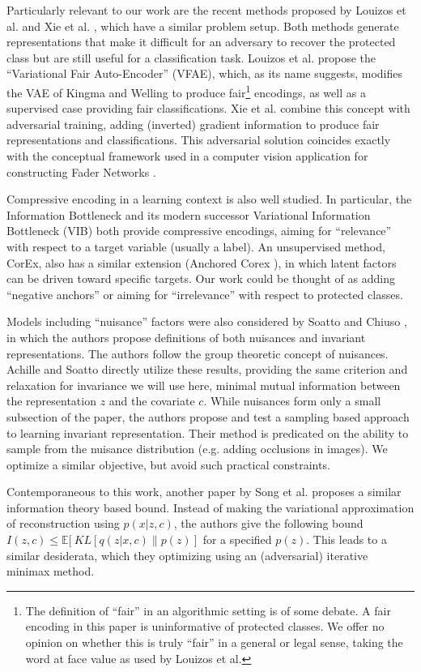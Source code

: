 Particularly relevant to our work are the recent methods proposed by Louizos et al. \cite{louizos2015variational} and Xie et al. \cite{xie2017controllable}, which have a similar problem setup. Both methods generate representations that make it difficult for an adversary to recover the protected class but are still useful for a classification task. Louizos et al. propose the ``Variational Fair Auto-Encoder'' (VFAE), which, as its name suggests, modifies the VAE of Kingma and Welling \cite{kingma2013auto} to produce fair\footnote{The definition of ``fair'' in an algorithmic setting is of some debate. A fair encoding in this paper is uninformative of protected classes. We offer no opinion on whether this is truly ``fair'' in a general or legal sense, taking the word at face value as used by Louizos et al.} encodings, as well as a supervised case providing fair classifications. Xie et al. combine this concept with adversarial training, adding (inverted) gradient information to produce fair representations and classifications. This adversarial solution coincides exactly with the conceptual framework used in a computer vision application for constructing Fader Networks \cite{lample2017fader}.

Compressive encoding in a learning context is also well studied. In particular, the Information Bottleneck \cite{tishby2000information} and its modern successor Variational Information Bottleneck (VIB) \cite{alemi2016deep,achille2018information} both provide compressive encodings, aiming for ``relevance'' with respect to a target variable (usually a label). An unsupervised method, CorEx, also has a similar extension (Anchored Corex \cite{gallagher2016anchored}), in which latent factors can be driven toward specific targets. Our work could be thought of as adding ``negative anchors'' or aiming for ``irrelevance'' with respect to protected classes.

Models including ``nuisance'' factors were also considered by Soatto and Chiuso \cite{soatto2014visual}, in which the authors propose definitions of both nuisances and invariant representations. The authors follow the group theoretic concept of nuisances. Achille and Soatto \cite{achille2017emergence} directly utilize these results, providing the same criterion and relaxation for invariance we will use here, minimal mutual information between the representation $z$ and the covariate $c$. While nuisances form only a small subsection of the paper, the authors propose and test a sampling based approach to learning invariant representation. Their method is predicated on the ability to sample from the nuisance distribution (e.g. adding occlusions in images). We optimize a similar objective, but avoid such practical constraints.

Contemporaneous to this work, another paper by Song et al. \cite{song2018learning} proposes a similar information theory based bound. Instead of making the variational approximation of reconstruction using $p(x|z,c)$, the authors give the following bound $I(z,c) \leq \mathbb{E}[~KL[q(z|x,c) \| p(z) ]$ for a specified $p(z)$. This leads to a similar desiderata, which they optimizing using an (adversarial) iterative minimax method.


